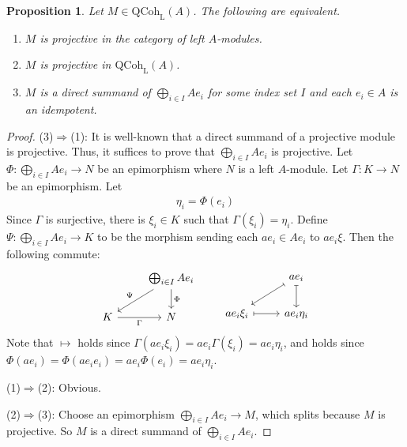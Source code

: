 \documentclass[11pt,b5paper,notitlepage]{article}
\theoremstyle{definition}
\theoremstyle{plain}
\newtheorem{pp}[df]{Proposition}
\newcommand{\QC}{\mathrm{QCoh}_{\mathrm L}}
\numberwithin{equation}{section}
\begin{document}
\begin{pp}\label{lb1}
Let $M\in\QC(A)$. The following are equivalent.
\begin{enumerate}[label=(\arabic*)]
\item $M$ is projective in the category of left $A$-modules.
\item $M$ is projective in $\QC(A)$.
\item $M$ is a direct summand of $\bigoplus_{i\in I}Ae_i$ for some index set $I$ and each $e_i\in A$ is an idempotent. 
\end{enumerate}
\end{pp}


\begin{proof}
(3)$\Rightarrow$(1): It is well-known that a direct summand of a projective module is projective. Thus, it suffices to prove that $\bigoplus_{i\in I}Ae_i$ is projective.  Let $\Phi:\bigoplus_{i\in I}Ae_i\rightarrow N$ be an epimorphism where $N$ is a left $A$-module.  Let $\Gamma:K\rightarrow N$ be an epimorphism. Let
\begin{align*}
\eta_i=\Phi(e_i)
\end{align*}
Since $\Gamma$ is surjective, there is $\xi_i\in K$ such that $\Gamma(\xi_i)=\eta_i$. Define $\Psi:\bigoplus_{i\in I}Ae_i\rightarrow K$ to be the morphism sending each $ae_i\in Ae_i$ to $ae_i\xi$. Then the following commute:
\begin{equation*}
\begin{tikzcd}
            & \bigoplus_{i\in I}Ae_i \arrow[d,"\Phi"] \arrow[ld,"\Psi"'] \\
K \arrow[r,"\Gamma"'] & N                     
\end{tikzcd}
\qquad
\begin{tikzcd}
                     & ae_i \arrow[d, maps to] \arrow[ld, maps to] \\
ae_i\xi_i \arrow[r, maps to] &  ae_i\eta_i                                       
\end{tikzcd}
\end{equation*}
Note that $\mapsto$ holds since $\Gamma(ae_i\xi_i)=ae_i\Gamma(\xi_i)=ae_i\eta_i$, and  holds since $\Phi(ae_i)=\Phi(ae_ie_i)=ae_i\Phi(e_i)=ae_i\eta_i$.

(1)$\Rightarrow$(2): Obvious.

(2)$\Rightarrow$(3): Choose an epimorphism $\bigoplus_{i\in I}Ae_i\rightarrow M$, which splits because $M$ is projective. So $M$ is a direct summand of $\bigoplus_{i\in I}Ae_i$.
\end{proof}
\end{document}
